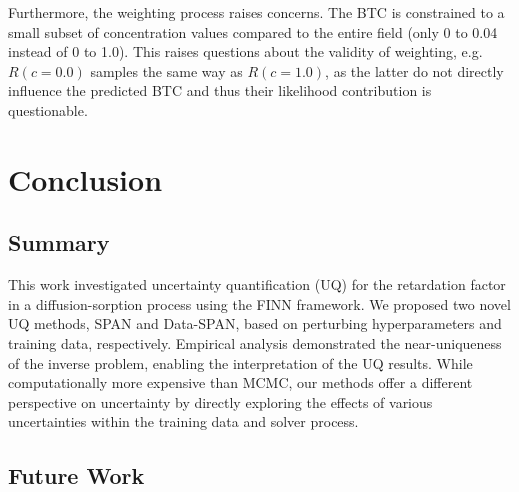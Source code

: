 Furthermore, the weighting process raises concerns. The BTC is constrained to a small subset of concentration values compared to the entire field (only 0 to 0.04 instead of 0 to 1.0). This raises questions about the validity of weighting, e.g. $R(c=0.0)$ samples the same way as $R(c=1.0)$, as the latter do not directly influence the predicted BTC and thus their likelihood contribution is questionable.


\section{Conclusion}
\subsection{Summary}
This work investigated uncertainty quantification (UQ) for the retardation factor in a diffusion-sorption process using the FINN framework. We proposed two novel UQ methods, SPAN and Data-SPAN, based on perturbing hyperparameters and training data, respectively. Empirical analysis demonstrated the near-uniqueness of the inverse problem, enabling the interpretation of the UQ results. While computationally more expensive than MCMC, our methods offer a different perspective on uncertainty by directly exploring the effects of various uncertainties within the training data and solver process.

\subsection{Future Work}

